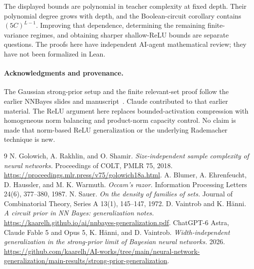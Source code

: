 \documentclass[11pt]{article}
\theoremstyle{remark}\newtheorem{remark}[theorem]{Remark}
\begin{document}
The displayed bounds are polynomial in teacher complexity at fixed depth. Their polynomial degree grows with depth, and the Boolean-circuit corollary contains $(5C)^{L-1}$. Improving that dependence, determining the remaining finite-variance regimes, and obtaining sharper shallow-ReLU bounds are separate questions. The proofs here have independent AI-agent mathematical review; they have not been formalized in Lean.

\paragraph{Acknowledgments and provenance.}
The Gaussian strong-prior setup and the finite relevant-set proof follow the earlier NNBayes slides and manuscript~\cite{slides,strong}. Claude contributed to that earlier material. The ReLU argument here replaces bounded-activation compression with homogeneous norm balancing and product-norm capacity control. No claim is made that norm-based ReLU generalization or the underlying Rademacher technique is new.

\begin{thebibliography}{9}
 N. Golowich, A. Rakhlin, and O. Shamir.
\emph{Size-independent sample complexity of neural networks.}
Proceedings of COLT, PMLR 75, 2018.
\url{https://proceedings.mlr.press/v75/golowich18a.html}.
 A. Blumer, A. Ehrenfeucht, D. Haussler, and M. K. Warmuth.
\emph{Occam's razor.} Information Processing Letters 24(6), 377--380, 1987.
 N. Sauer. \emph{On the density of families of sets.}
Journal of Combinatorial Theory, Series A 13(1), 145--147, 1972.
 D. Vaintrob and K. H\"anni.
\emph{A circuit prior in NN Bayes: generalization notes.}
\url{https://kaarelh.github.io/ai/nnbayes-generalization.pdf}.
 ChatGPT-6 Astra, Claude Fable 5 and Opus 5, K. H\"anni, and D. Vaintrob.
\emph{Width-independent generalization in the strong-prior limit of Bayesian neural networks.} 2026.
\url{https://github.com/kaarelh/AI-works/tree/main/neural-network-generalization/main-results/strong-prior-generalization}.
\end{thebibliography}
\end{document}
